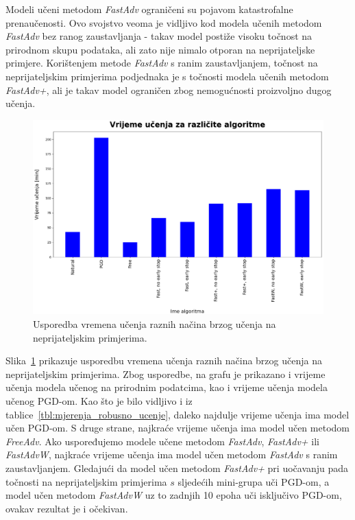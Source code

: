 \documentclass[times, utf8, zavrsni, numeric]{fer}
\begin{document}
Modeli učeni metodom \textit{FastAdv} ograničeni su pojavom katastrofalne prenaučenosti. 
Ovo svojstvo veoma je vidljivo kod modela učenih metodom \textit{FastAdv} bez ranog zaustavljanja - takav model postiže visoku točnost na prirodnom skupu podataka, ali zato nije nimalo otporan na neprijateljske primjere.
Korištenjem metode \textit{FastAdv} s ranim zaustavljanjem, točnost na neprijateljskim primjerima podjednaka je s točnosti modela učenih metodom \textit{FastAdv+},
ali je takav model ograničen zbog nemogućnosti proizvoljno dugog učenja.

\pagebreak
\begin{figure}[htb]
    \centering
    \includegraphics[scale=0.42]{../stats/stats_comparison_train_time.png}
    \caption{Usporedba vremena učenja raznih načina brzog učenja na neprijateljskim primjerima.}
    \label{fig:train_time_comparison}
\end{figure}

Slika~\ref{fig:train_time_comparison} prikazuje usporedbu vremena učenja raznih načina brzog učenja na neprijateljskim primjerima.
Zbog usporedbe, na grafu je prikazano i vrijeme učenja modela učenog na prirodnim podatcima, kao i vrijeme učenja modela učenog PGD-om.
Kao što je bilo vidljivo i iz tablice~\ref{tbl:mjerenja_robusno_ucenje}, daleko najdulje vrijeme učenja ima model učen PGD-om.
S druge strane, najkraće vrijeme učenja ima model učen metodom \textit{FreeAdv}. 
Ako uspoređujemo modele učene metodom \textit{FastAdv}, \textit{FastAdv+} ili \textit{FastAdvW}, najkraće vrijeme učenja ima model učen metodom \textit{FastAdv} s ranim zaustavljanjem.
Gledajući da model učen metodom \textit{FastAdv+} pri uočavanju pada točnosti na neprijateljskim primjerima $s$ sljedećih mini-grupa uči PGD-om, 
a model učen metodom \textit{FastAdvW} uz to zadnjih 10 epoha uči isključivo PGD-om, ovakav rezultat je i očekivan.
\end{document}
